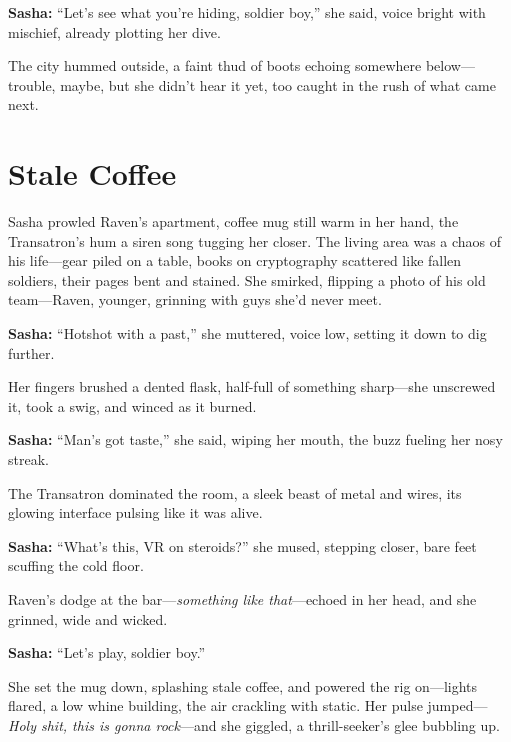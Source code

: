 \documentclass[12pt]{book}
\begin{document}
\vspace{0.5em}
\textbf{Sasha:} “Let’s see what you’re hiding, soldier boy,” she said, voice bright with mischief, already plotting her dive.

The city hummed outside, a faint thud of boots echoing somewhere below—trouble, maybe, but she didn’t hear it yet, too caught in the rush of what came next.

\vspace{1em}

\section{Stale Coffee}

Sasha prowled Raven’s apartment, coffee mug still warm in her hand, the Transatron’s hum a siren song tugging her closer. The living area was a chaos of his life—gear piled on a table, books on cryptography scattered like fallen soldiers, their pages bent and stained. She smirked, flipping a photo of his old team—Raven, younger, grinning with guys she’d never meet. 

\vspace{0.5em}
\textbf{Sasha:} “Hotshot with a past,” she muttered, voice low, setting it down to dig further.

Her fingers brushed a dented flask, half-full of something sharp—she unscrewed it, took a swig, and winced as it burned. 

\vspace{0.5em}
\textbf{Sasha:} “Man’s got taste,” she said, wiping her mouth, the buzz fueling her nosy streak.

The Transatron dominated the room, a sleek beast of metal and wires, its glowing interface pulsing like it was alive. 

\vspace{0.5em}
\textbf{Sasha:} “What’s this, VR on steroids?” she mused, stepping closer, bare feet scuffing the cold floor.

Raven’s dodge at the bar—\emph{something like that}—echoed in her head, and she grinned, wide and wicked. 

\vspace{0.5em}
\textbf{Sasha:} “Let’s play, soldier boy.”

She set the mug down, splashing stale coffee, and powered the rig on—lights flared, a low whine building, the air crackling with static. Her pulse jumped—\emph{Holy shit, this is gonna rock}—and she giggled, a thrill-seeker’s glee bubbling up.
\end{document}

